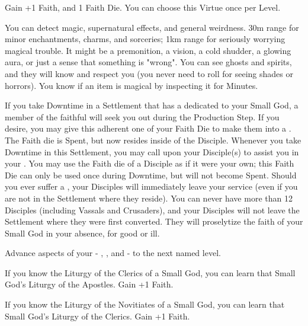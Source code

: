 \begin{multicols*}{2}
Gain +1 \MAX Faith, and 1 Faith Die. You can choose this Virtue once per Level.



You can detect magic, supernatural effects, and general weirdness. 30m range for minor enchantments, charms, and sorceries; 1km range for seriously worrying magical trouble. It might be a premonition, a vision, a cold shudder, a glowing aura, or just a sense that something is "wrong". You can see ghosts and spirits, and they will know and respect you (you never need to roll \INSANITY for seeing shades or horrors). You know if an item is magical by inspecting it for Minutes.


If you take Downtime in a Settlement that has a  dedicated to your Small God, a member of the faithful will seek you out during the Production Step.  If you desire, you may give this adherent one of your Faith Die to make them into a . The Faith die is Spent, but now resides inside of the Disciple.  Whenever you take Downtime in this Settlement, you may call upon your Disciple(s) to assist you in your . You may use the Faith die of a Disciple as if it were your own; this Faith Die can only be used once during Downtime, but will not become Spent. Should you ever suffer a , your Disciples will immediately leave your service (even if you are not in the Settlement where they reside). You can never have more than 12 Disciples (including Vassals and Crusaders), and your Disciples will not leave the Settlement where they were first converted. They will proselytize the faith of your Small God in your absence, for good or ill.


Advance  aspects of your  - \DEATH, \INJURY, and \INSANITY - to the next named level.


If you know the Liturgy of the Clerics of a Small God, you can learn that Small God's Liturgy of the Apostles. Gain +1 \MAX Faith.


If you know the Liturgy of the Novitiates of a Small God, you can learn that Small God's Liturgy of the Clerics. Gain +1 \MAX Faith.


\end{multicols*}
